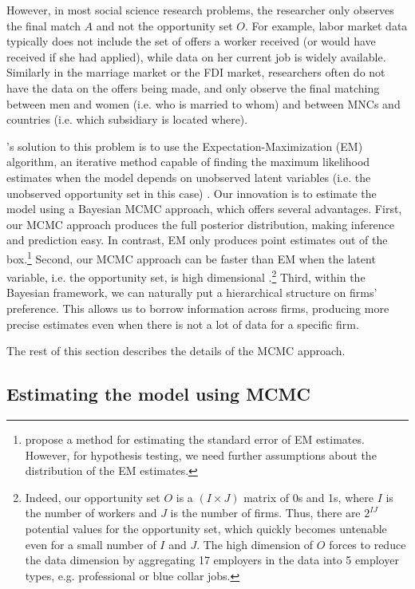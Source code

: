 However, in most social science research problems, the researcher only observes
the final match $A$ and not the opportunity set $O$. For example, labor market
data typically does not include the set of offers a worker received (or would
have received if she had applied), while data on her current job is widely
available. Similarly in the marriage market or the FDI market, researchers often
do not have the data on the offers being made, and only observe the final
matching between men and women (i.e. who is married to whom) and between MNCs
and countries (i.e. which subsidiary is located where).

\citet{Logan1998}'s solution to this problem is to use the
Expectation-Maximization (EM) algorithm, an iterative method capable of finding
the maximum likelihood estimates when the model depends on unobserved latent
variables (i.e. the unobserved opportunity set in this case)
\citep{Dempster1977}. Our innovation is to estimate the model using a Bayesian
MCMC approach, which offers several advantages. First, our MCMC approach
produces the full posterior distribution, making inference and prediction easy. In contrast, EM
only produces point estimates out of the box.\footnote{\citet{Jamshidian2000}
  propose a method for estimating the standard error of EM estimates. However,
  for hypothesis testing, we need further assumptions about the distribution of
  the EM estimates.} Second, our MCMC approach can be faster than EM when the
latent variable, i.e. the opportunity set, is high dimensional
\citep{Ryden2008}.\footnote{Indeed, our opportunity set $O$ is a $(I \times J)$
  matrix of 0s and 1s, where $I$ is the number of workers and $J$ is the number
  of firms. Thus, there are $2^{IJ}$ potential values for the opportunity set,
  which quickly becomes untenable even for a small number of $I$ and $J$. The
  high dimension of $O$ forces \citet{Logan1998} to reduce the data dimension by
  aggregating 17 employers in the data into 5 employer types, e.g. professional
  or blue collar jobs.} Third, within the Bayesian framework, we can naturally
put a hierarchical structure on firms' preference. This allows us to borrow
information across firms, producing more precise estimates even when there is
not a lot of data for a specific firm.

The rest of this section describes the details of the MCMC approach.

\subsection{Estimating the model using MCMC}

